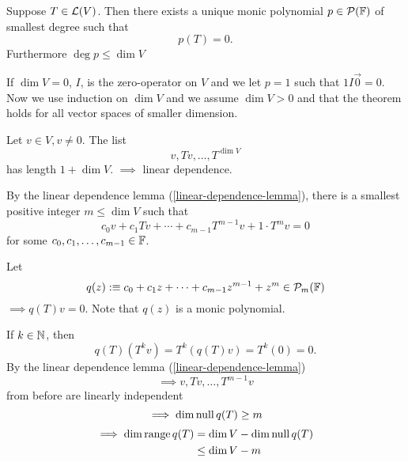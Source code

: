 \begin{thm}
  \label{unique-monic-polynomial-of-smallest-degree}
  Suppose $T\in \mathcal{L}(V)$. Then there exists a unique monic polynomial $p\in \mathcal{P}(\mathbb{F})$ of smallest degree such that 
  \begin{equation}
    p(T)=0. 
  \end{equation}
  Furthermore $\deg p \leq \dim V$
\end{thm}
\begin{prf}
  If $\dim V=0$, $I$, is the zero-operator on $V$ and we let $p=1$ such that $1I\vec0=0$.           Now we use induction on $\dim V$ and we assume $\dim V > 0$ and that the theorem holds for all vector spaces of smaller dimension.
  
  Let $v\in V, v \neq 0$. The list \begin{equation}
    v, Tv, \dots, T^{\dim V}
  \end{equation}
  has length $1+\dim V.$
  $\implies$ linear dependence.

  By the linear dependence lemma (\ref{linear-dependence-lemma}), there is a smallest positive integer $m\leq \dim V$ such that
  \begin{equation}
    c_0 v + c_1 Tv + \cdots + c_{m-1} T^{m-1} v + 1\cdot T^m v = 0
  \end{equation}
  for some $c_0, c_1, \dots, c_{m-1} \in \mathbb{F}$. 

  Let
  \[ q(z) :\equiv c_0 + c_1z + \cdots + c_{m-1} z^{m-1} +z^{m} \in \mathcal{P}_m (\mathbb{F}) \]
  $\implies q(T) v=0$. Note that $q(z)$ is a monic polynomial.

  If $k \in \mathbb{N}$, then
  \begin{equation}
    q(T)(T^kv)=T^k(q(T)v) =T^k (0) =0.
  \end{equation}
  By the linear dependence lemma (\ref{linear-dependence-lemma}) \begin{equation}
    \implies v, Tv, \dots, T^{m-1}v
  \end{equation}
  from before are linearly independent \begin{equation}
    \implies \dim \operatorname{null} q(T) \geq m
  \end{equation}
  \begin{equation}
    \begin{aligned}
    \implies
    \dim \operatorname{range} q(T)
      &= \dim V - \dim \operatorname{null} q(T) \\
      &\leq \dim V - m
    \end{aligned}
  \end{equation}
  

\end{prf}
